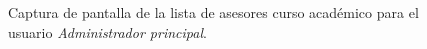   \begin{figure}[!ht]
    \begin{center}
      \caption{Captura de pantalla de la lista de asesores curso académico para el usuario \textit{Administrador principal}.}
      \label{capturaPantallaListaAsesoresCAAdminPrincipal}
    \end{center}
  \end{figure}
